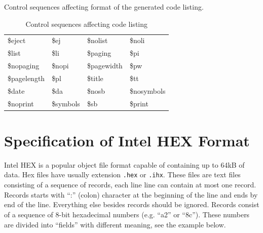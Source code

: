 \documentclass[a4paper,twoside,12pt]{book}
\newcommand{\fileextension}[1]{\texttt{#1}}
\newcommand{\mysmallfont}{\fontsize{8pt}{10pt} \selectfont{}}
\begin{document}
		Control sequences affecting format of the generated code listing.
		\begin{table}[h!]
			\centering{}
			\mysmallfont{}
			\caption{Control sequences affecting code listing}
			\begin{tabular}{|llll|}
				\hline
				\$eject		& \$ej		& \$nolist	& \$noli	\\
				\$list		& \$li		& \$paging	& \$pi		\\
				\$nopaging	& \$nopi	& \$pagewidth	& \$pw		\\
				\$pagelength	& \$pl		& \$title	& \$tt		\\
				\$date		& \$da		& \$nosb	& \$nosymbols	\\
				\$noprint	& \$symbols	& \$sb		& \$print	\\
				\hline
			\end{tabular}
		\end{table}

	\clearpage
	\section{Specification of Intel HEX Format}
		Intel HEX is a popular object file format capable of containing up to 64kB of data. Hex files have usually extension \fileextension{.hex} or \fileextension{.ihx}. These files are text files consisting of a sequence of records, each line line can contain at most one record. Records starts with ``:'' (colon) character at the beginning of the line and ends by end of the line. Everything else besides records should be ignored. Records consist of a sequence of 8-bit hexadecimal numbers (e.g. ``a2'' or ``8c''). These numbers are divided into ``fields'' with different meaning, see the example below.
\end{document}
